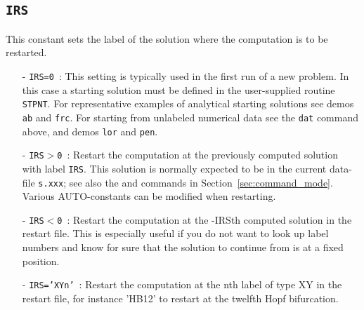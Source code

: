 \documentclass[12pt]{report}
\begin{document}
\subsection{\tt IRS}  \label{sec:IRS}
This constant sets the label of the solution where the computation
is to be restarted.
\begin{itemize}
\item[-] {\tt IRS=0}~:  
  This setting is typically used in the first run of a new problem.
  In this case a starting solution must be defined in the user-supplied
  routine {\tt STPNT}.
  For representative examples of analytical starting solutions 
  see demos {\tt ab} and {\tt frc}.
  For starting from unlabeled numerical data see the {\tt dat} command
  above, and demos {\tt lor} and {\tt pen}.
  
\item[-] {\tt IRS$>$0}~: 
  Restart the computation at the previously computed solution with label {\tt IRS}. 
  This solution is normally expected to be in the current data-file 
 {\tt s.xxx}; see also the  and  commands in 
 Section~\ref{sec:command_mode}.
 Various {\cal AUTO}-constants can be modified when restarting.

\item[-] {\tt IRS$<$0}~:
  Restart the computation at the -IRSth computed solution in the
  restart file. This is especially useful if you do not want to look
  up label numbers and know for sure that the solution to continue
  from is at a fixed position.
\item[-] {\tt IRS='XYn'}~:
  Restart the computation at the nth label of type XY in the
  restart file, for instance 'HB12' to restart at the twelfth Hopf
  bifurcation.
\end{itemize}
\end{document}
